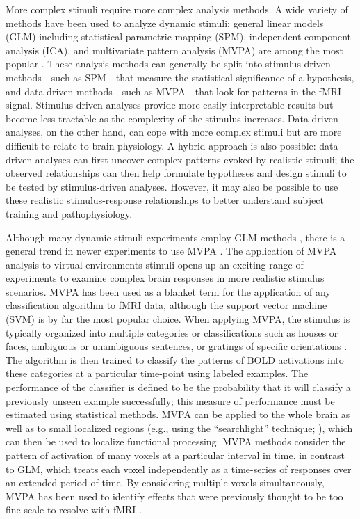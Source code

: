\documentclass[5p,authoryear]{elsarticle}
\begin{document}
More complex stimuli require more complex analysis methods.
A wide variety of methods have been used to analyze dynamic stimuli; general linear models (GLM) including statistical parametric mapping (SPM), independent component analysis (ICA), and multivariate pattern analysis (MVPA) are among the most popular \citep{Spiers2007}.
These analysis methods can generally be split into stimulus-driven methods---such as SPM---that measure the statistical significance of a hypothesis, and data-driven methods---such as MVPA---that look for patterns in the fMRI signal.
Stimulus-driven analyses provide more easily interpretable results but become less tractable as the complexity of the stimulus increases.
Data-driven analyses, on the other hand, can cope with more complex stimuli but are more difficult to relate to brain physiology.
A hybrid approach is also possible: data-driven analyses can first uncover complex patterns evoked by realistic stimuli; the observed relationships can then help formulate hypotheses and design stimuli to be tested by stimulus-driven analyses. 
However, it may also be possible to use these realistic stimulus-response relationships to better understand subject training and pathophysiology.

Although many dynamic stimuli experiments employ GLM methods \citep{Maguire1998,Calhoun2002,King2006,Mathiak2006,Spiers2007a}, there is a general trend in newer experiments to use MVPA \citep{Hassabis2009,Chadwick2010}. 
The application of MVPA analysis to virtual environments stimuli opens up an exciting range of experiments to examine complex brain responses in more realistic stimulus scenarios.
MVPA has been used as a blanket term for the application of any classification algorithm to fMRI data, although the support vector machine (SVM) is by far the most popular choice.
When applying MVPA, the stimulus is typically organized into multiple categories or classifications such as houses or faces, ambiguous or unambiguous sentences, or gratings of specific orientations \citep{Haxby2001,Mitchell2003,Haynes2006}.
The algorithm is then trained to classify the patterns of BOLD activations into these categories at a particular time-point using labeled examples.
The performance of the classifier is defined to be the probability that it will classify a previously unseen example successfully;
this measure of performance must be estimated using statistical methods.
MVPA can be applied to the whole brain as well as to small localized regions (e.g., using the ``searchlight'' technique; \cite{Kriegeskorte2006}), which can then be used to localize functional processing.
MVPA methods consider the pattern of activation of many voxels at a particular interval in time, in contrast to GLM, which treats each voxel independently as a time-series of responses over an extended period of time.
By considering multiple voxels simultaneously, MVPA has been used to identify effects that were previously thought to be too fine scale to resolve with fMRI \citep{Kamitani2005,Hassabis2009}.
\end{document}
